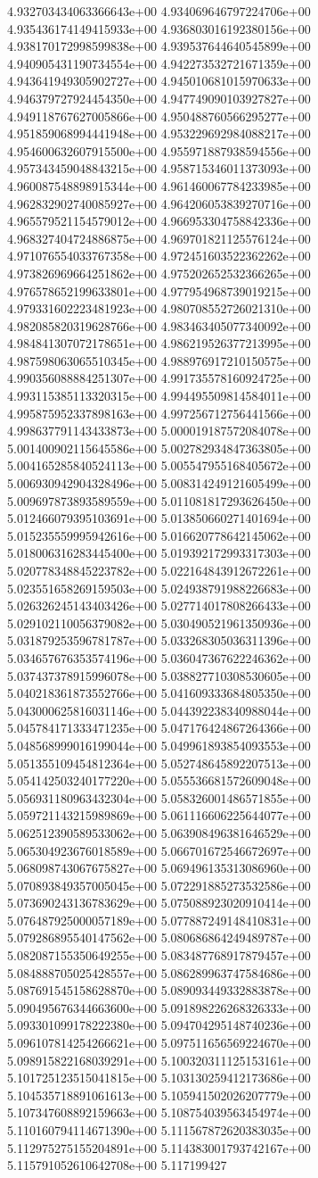 4.932703434063366643e+00	4.934069646797224706e+00	4.935436174149415933e+00	4.936803016192380156e+00	4.938170172998599838e+00	4.939537644640545899e+00	4.940905431190734554e+00	4.942273532721671359e+00	4.943641949305902727e+00	4.945010681015970633e+00	4.946379727924454350e+00	4.947749090103927827e+00	4.949118767627005866e+00	4.950488760566295277e+00	4.951859068994441948e+00	4.953229692984088217e+00	4.954600632607915500e+00	4.955971887938594556e+00	4.957343459048843215e+00	4.958715346011373093e+00	4.960087548898915344e+00	4.961460067784233985e+00	4.962832902740085927e+00	4.964206053839270716e+00	4.965579521154579012e+00	4.966953304758842336e+00	4.968327404724886875e+00	4.969701821125576124e+00	4.971076554033767358e+00	4.972451603522362262e+00	4.973826969664251862e+00	4.975202652532366265e+00	4.976578652199633801e+00	4.977954968739019215e+00	4.979331602223481923e+00	4.980708552726021310e+00	4.982085820319628766e+00	4.983463405077340092e+00	4.984841307072178651e+00	4.986219526377213995e+00	4.987598063065510345e+00	4.988976917210150575e+00	4.990356088884251307e+00	4.991735578160924725e+00	4.993115385113320315e+00	4.994495509814584011e+00	4.995875952337898163e+00	4.997256712756441566e+00	4.998637791143433873e+00	5.000019187572084078e+00	5.001400902115645586e+00	5.002782934847363805e+00	5.004165285840524113e+00	5.005547955168405672e+00	5.006930942904328496e+00	5.008314249121605499e+00	5.009697873893589559e+00	5.011081817293626450e+00	5.012466079395103691e+00	5.013850660271401694e+00	5.015235559995942616e+00	5.016620778642145062e+00	5.018006316283445400e+00	5.019392172993317303e+00	5.020778348845223782e+00	5.022164843912672261e+00	5.023551658269159503e+00	5.024938791988226683e+00	5.026326245143403426e+00	5.027714017808266433e+00	5.029102110056379082e+00	5.030490521961350936e+00	5.031879253596781787e+00	5.033268305036311396e+00	5.034657676353574196e+00	5.036047367622246362e+00	5.037437378915996078e+00	5.038827710308530605e+00	5.040218361873552766e+00	5.041609333684805350e+00	5.043000625816031146e+00	5.044392238340988044e+00	5.045784171333471235e+00	5.047176424867264366e+00	5.048568999016199044e+00	5.049961893854093553e+00	5.051355109454812364e+00	5.052748645892207513e+00	5.054142503240177220e+00	5.055536681572609048e+00	5.056931180963432304e+00	5.058326001486571855e+00	5.059721143215989869e+00	5.061116606225644077e+00	5.062512390589533062e+00	5.063908496381646529e+00	5.065304923676018589e+00	5.066701672546672697e+00	5.068098743067675827e+00	5.069496135313086960e+00	5.070893849357005045e+00	5.072291885273532586e+00	5.073690243136783629e+00	5.075088923020910414e+00	5.076487925000057189e+00	5.077887249148410831e+00	5.079286895540147562e+00	5.080686864249489787e+00	5.082087155350649255e+00	5.083487768917879457e+00	5.084888705025428557e+00	5.086289963747584686e+00	5.087691545158628870e+00	5.089093449332883878e+00	5.090495676344663600e+00	5.091898226268326333e+00	5.093301099178222380e+00	5.094704295148740236e+00	5.096107814254266621e+00	5.097511656569224670e+00	5.098915822168039291e+00	5.100320311125153161e+00	5.101725123515041815e+00	5.103130259412173686e+00	5.104535718891061613e+00	5.105941502026207779e+00	5.107347608892159663e+00	5.108754039563454974e+00	5.110160794114671390e+00	5.111567872620383035e+00	5.112975275155204891e+00	5.114383001793742167e+00	5.115791052610642708e+00	5.117199427